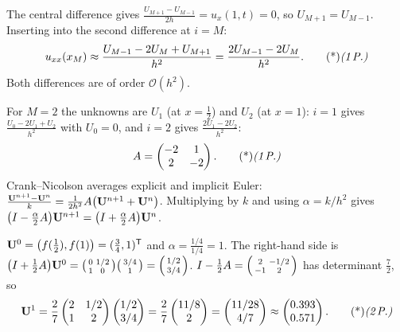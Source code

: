 \begin{solution}
 The central difference gives $\frac{U_{M+1}-U_{M-1}}{2h}=u_x(1,t)=0$, so $U_{M+1}=U_{M-1}$. 
Inserting into the second difference at $i=M$:
\[
u_{xx}(x_M)\approx\frac{U_{M-1}-2U_M+U_{M+1}}{h^2}=\frac{2U_{M-1}-2U_M}{h^2}.\ptd{1}
\]
Both differences are of order $\mathcal O(h^2)$. 

 For $M=2$ the unknowns are $U_1$ (at $x=\frac12$) and $U_2$ (at $x=1$): $i=1$ gives $\frac{U_0-2U_1+U_2}{h^2}$ with $U_0=0$, and $i=2$ gives $\frac{2U_1-2U_2}{h^2}$:
\[
A=\begin{pmatrix}-2&1\\2&-2\end{pmatrix}.\ptd{1}
\]
Crank--Nicolson averages explicit and implicit Euler:
$\frac{\mathbf{U}^{n+1}-\mathbf{U}^n}k=\frac1{2h^2}A\big(\mathbf{U}^{n+1}+\mathbf{U}^n\big)$. Multiplying by $k$ and using $\alpha=k/h^2$ gives $\big(I-\frac\alpha2A\big)\mathbf{U}^{n+1}=\big(I+\frac\alpha2A\big)\mathbf{U}^n$. 

 $\mathbf{U}^0=\big(f(\frac12),f(1)\big)=(\frac34,1)^{\mathsf{T}}$ and $\alpha=\frac{1/4}{1/4}=1$. The right-hand side is $\big(I+\frac12A\big)\mathbf{U}^0=\begin{psmallmatrix}0&1/2\\1&0\end{psmallmatrix}\begin{psmallmatrix}3/4\\1\end{psmallmatrix}=\begin{psmallmatrix}1/2\\3/4\end{psmallmatrix}$. 
$I-\frac12A=\begin{psmallmatrix}2&-1/2\\-1&2\end{psmallmatrix}$ has determinant $\frac72$, so
\[
\vb U^1=\frac27\begin{pmatrix}2&1/2\\1&2\end{pmatrix}\begin{pmatrix}1/2\\3/4\end{pmatrix}=\frac27\begin{pmatrix}11/8\\2\end{pmatrix}=\begin{pmatrix}11/28\\4/7\end{pmatrix}\approx\begin{pmatrix}0.393\\0.571\end{pmatrix}.\ptd{2}
\]


\end{solution}
